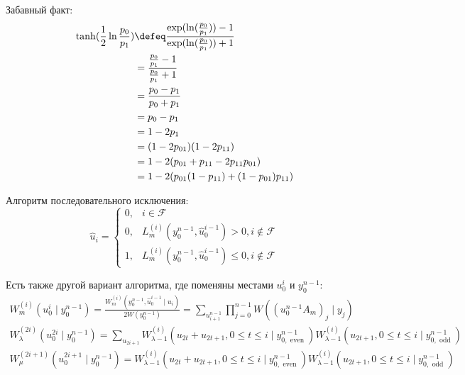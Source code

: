 Забавный факт:
\begin{align*}
	\tanh(\frac{1}{2}\ln \frac{p_0}{p_1})
    & \defeq \frac{\exp(\ln(\frac{p_0}{p_1}))- 1}{\exp(\ln(\frac{p_0}{p_1})) + 1} \\
    & = \frac{\frac{p_0}{p_1} - 1}{\frac{p_0}{p_1} + 1} \\
    & = \frac{p_0 - p_1}{p_0 + p_1} \\
    & = p_0 - p_1 \\
    & = 1 - 2p_1 \\
    & = (1 - 2p_{01})(1 - 2p_{11}) \\
    & = 1 - 2(p_{01} + p_{11} - 2p_{11}p_{01}) \\
    & = 1 - 2(p_{01}(1 - p_{11}) + (1 - p_{01})p_{11})
\end{align*}


\?

Алгоритм последовательного исключения:
\[\hat{u}_i = \begin{cases}
    0, & i \in \mathcal{F} \\
    0, & L_m^{(i)}(y^{n-1}_0,\hat{u}^{i-1}_0) > 0, i \notin \mathcal{F} \\
    1, & L_m^{(i)}(y^{n-1}_0,\hat{u}^{i-1}_0) \leq 0, i \notin \mathcal{F}
\end{cases}\]

Есть также другой вариант алгоритма, где поменяны местами \(u_0^i\) и \(y^{n-1}_0\):
\[\begin{gathered}
W_m^{(i)}\left(u_0^i \mid y_0^{n-1}\right)=\frac{W_m^{(i)}\left(y_0^{n-1}, \widehat{u}_0^{i-1} \mid u_i\right)}{2 W\left(y_0^{n-1}\right)}=\sum_{u_{i+1}^{n-1}} \prod_{j=0}^{n-1} W\left(\left(u_0^{n-1} A_m\right)_j \mid y_j\right) \\
W_\lambda^{(2 i)}\left(u_0^{2 i} \mid y_0^{n-1}\right)=\sum_{u_{2 i+1}} W_{\lambda-1}^{(i)}\left(u_{2 t}+u_{2 t+1}, 0 \leq t \leq i \mid y_{0, \text { even }}^{n-1}\right) W_{\lambda-1}^{(i)}\left(u_{2 t+1}, 0 \leq t \leq i \mid y_{0, \text { odd }}^{n-1}\right) \\
W_\mu^{(2 i+1)}\left(u_0^{2 i+1} \mid y_0^{n-1}\right)=W_{\lambda-1}^{(i)}\left(u_{2 t}+u_{2 t+1}, 0 \leq t \leq i \mid y_{0, \text { even }}^{n-1}\right) W_{\lambda-1}^{(i)}\left(u_{2 t+1}, 0 \leq t \leq i \mid y_{0, \text { odd }}^{n-1}\right)
\end{gathered}\]

